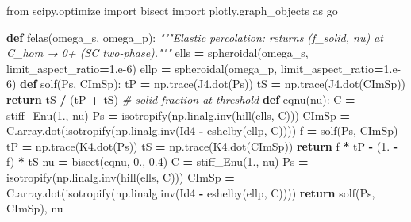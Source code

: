 \documentclass[
  a4paper,
  numbers=noendperiod,
  DIV=12]{scrreprt}
\newenvironment{Shaded}{\begin{snugshade}}{\end{snugshade}}
\newcommand{\CommentTok}[1]{\textcolor[rgb]{0.56,0.35,0.01}{\textit{#1}}}
\newcommand{\ControlFlowTok}[1]{\textcolor[rgb]{0.13,0.29,0.53}{\textbf{#1}}}
\newcommand{\FloatTok}[1]{\textcolor[rgb]{0.00,0.00,0.81}{#1}}
\newcommand{\ImportTok}[1]{#1}
\newcommand{\KeywordTok}[1]{\textcolor[rgb]{0.13,0.29,0.53}{\textbf{#1}}}
\newcommand{\NormalTok}[1]{#1}
\newcommand{\OperatorTok}[1]{\textcolor[rgb]{0.81,0.36,0.00}{\textbf{#1}}}
\begin{document}
\begin{Shaded}
\begin{Highlighting}[]
\ImportTok{from}\NormalTok{ scipy.optimize }\ImportTok{import}\NormalTok{ bisect}
\ImportTok{import}\NormalTok{ plotly.graph\_objects }\ImportTok{as}\NormalTok{ go}

\KeywordTok{def}\NormalTok{ felas(omega\_s, omega\_p):}
    \CommentTok{"""Elastic percolation: returns (f\_solid, nu) at C\_hom → 0+ (SC two{-}phase)."""}
\NormalTok{    ells }\OperatorTok{=}\NormalTok{ spheroidal(omega\_s, limit\_aspect\_ratio}\OperatorTok{=}\FloatTok{1.e{-}6}\NormalTok{)}
\NormalTok{    ellp }\OperatorTok{=}\NormalTok{ spheroidal(omega\_p, limit\_aspect\_ratio}\OperatorTok{=}\FloatTok{1.e{-}6}\NormalTok{)}
    \KeywordTok{def}\NormalTok{ solf(Ps, CImSp):}
\NormalTok{        tP }\OperatorTok{=}\NormalTok{ np.trace(J4.dot(Ps))}
\NormalTok{        tS }\OperatorTok{=}\NormalTok{ np.trace(J4.dot(CImSp))}
        \ControlFlowTok{return}\NormalTok{ tS }\OperatorTok{/}\NormalTok{ (tP }\OperatorTok{+}\NormalTok{ tS)          }\CommentTok{\# solid fraction at threshold}
    \KeywordTok{def}\NormalTok{ eqnu(nu):}
\NormalTok{        C     }\OperatorTok{=}\NormalTok{ stiff\_Enu(}\FloatTok{1.}\NormalTok{, nu)}
\NormalTok{        Ps    }\OperatorTok{=}\NormalTok{ isotropify(np.linalg.inv(hill(ells, C)))}
\NormalTok{        CImSp }\OperatorTok{=}\NormalTok{ C.array.dot(isotropify(np.linalg.inv(Id4 }\OperatorTok{{-}}\NormalTok{ eshelby(ellp, C))))}
\NormalTok{        f     }\OperatorTok{=}\NormalTok{ solf(Ps, CImSp)}
\NormalTok{        tP }\OperatorTok{=}\NormalTok{ np.trace(K4.dot(Ps))}
\NormalTok{        tS }\OperatorTok{=}\NormalTok{ np.trace(K4.dot(CImSp))}
        \ControlFlowTok{return}\NormalTok{ f }\OperatorTok{*}\NormalTok{ tP }\OperatorTok{{-}}\NormalTok{ (}\FloatTok{1.} \OperatorTok{{-}}\NormalTok{ f) }\OperatorTok{*}\NormalTok{ tS}
\NormalTok{    nu    }\OperatorTok{=}\NormalTok{ bisect(eqnu, }\FloatTok{0.}\NormalTok{, }\FloatTok{0.4}\NormalTok{)}
\NormalTok{    C     }\OperatorTok{=}\NormalTok{ stiff\_Enu(}\FloatTok{1.}\NormalTok{, nu)}
\NormalTok{    Ps    }\OperatorTok{=}\NormalTok{ isotropify(np.linalg.inv(hill(ells, C)))}
\NormalTok{    CImSp }\OperatorTok{=}\NormalTok{ C.array.dot(isotropify(np.linalg.inv(Id4 }\OperatorTok{{-}}\NormalTok{ eshelby(ellp, C))))}
    \ControlFlowTok{return}\NormalTok{ solf(Ps, CImSp), nu}


\end{Highlighting}
\end{Shaded}
\end{document}
